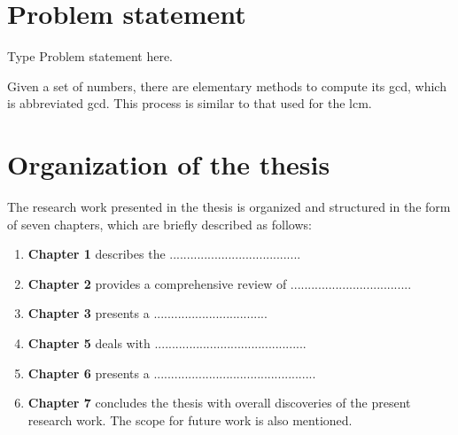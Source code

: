 \section{Problem statement} \label{S1.3}
 Type Problem statement here.

 Given a set of numbers, there are elementary methods to compute 
its \acrlong{gcd}, which is abbreviated \acrshort{gcd}. This process 
is similar to that used for the \acrfull{lcm}.

\clearpage

\printglossary[type=\acronymtype]

\section{Organization of the thesis} \label{S1.4}
The research work presented in the thesis is organized and structured in the form of seven chapters, which are briefly described as follows:
\begin{enumerate}[label=\textbf{\roman*)}]
	\item \textbf{Chapter 1} describes the ......................................
	\item \textbf{Chapter 2} provides a comprehensive review of ...................................
	\item \textbf{Chapter 3} presents a .................................
	\item \textbf{Chapter 5} deals with ............................................
	\item \textbf{Chapter 6} presents a ...............................................
	\item \textbf{Chapter 7} concludes the thesis with overall discoveries of the present research work. The scope for future work is also mentioned. 
\end{enumerate} 
